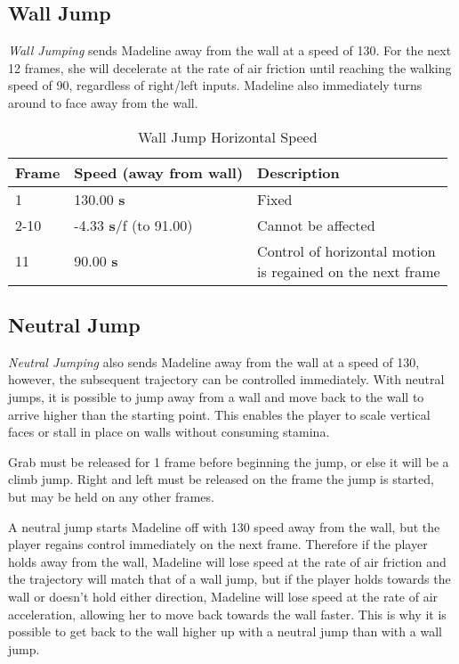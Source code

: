 \documentclass[oneside]{book}
\newcommand{\s}{\textbf{s}}
\begin{document}
\subsection{Wall Jump}

\textit{Wall Jumping} sends Madeline away from the wall at a speed of 130. For the next 12 frames, she will decelerate at the rate of air friction until reaching the walking speed of 90, regardless of right/left inputs. Madeline also immediately turns around to face away from the wall.

\begin{table}[h]
\begin{tabular}{|l|l|l|}
\hline
Frame&Speed (away from wall)&Description\\
\hline
1&130.00 \s &Fixed\\
\hline
2-10&-4.33 \s/f (to 91.00)&Cannot be affected\\
\hline
11&90.00 \s &\makecell[l]{Control of horizontal motion\\ is regained on the next frame}\\
\hline
\end{tabular}
\caption{Wall Jump Horizontal Speed}
\end{table}

\subsection{Neutral Jump}

\textit{Neutral Jumping} also sends Madeline away from the wall at a speed of 130, however, the subsequent trajectory can be controlled immediately. With neutral jumps, it is possible to jump away from a wall and move back to the wall to arrive higher than the starting point. This enables the player to scale vertical faces or stall in place on walls without consuming stamina.

Grab must be released for 1 frame before beginning the jump, or else it will be a climb jump. Right and left must be released on the frame the jump is started, but may be held on any other frames.

A neutral jump starts Madeline off with 130 speed away from the wall, but the player regains control immediately on the next frame. Therefore if the player holds away from the wall, Madeline will lose speed at the rate of air friction and the trajectory will match that of a wall jump, but if the player holds towards the wall or doesn't hold either direction, Madeline will lose speed at the rate of air acceleration, allowing her to move back towards the wall faster. This is why it is possible to get back to the wall higher up with a neutral jump than with a wall jump.
\end{document}
